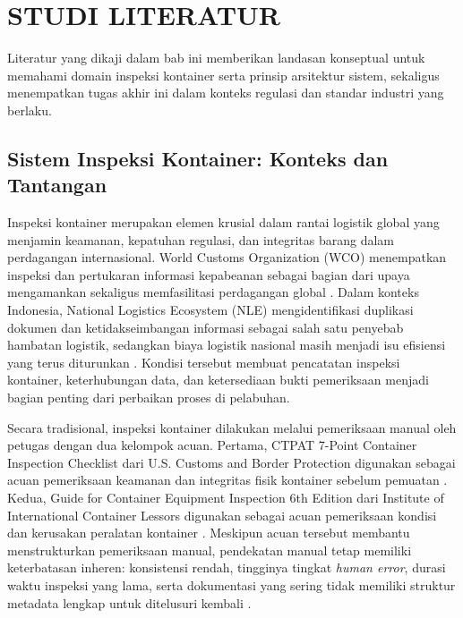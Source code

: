 \cleardoublepage
\chapter{STUDI LITERATUR}
\label{chap:studi-literatur}

Literatur yang dikaji dalam bab ini memberikan landasan konseptual untuk
memahami domain inspeksi kontainer serta prinsip arsitektur sistem, sekaligus
menempatkan tugas akhir ini dalam konteks regulasi dan standar industri yang
berlaku.

\section{Sistem Inspeksi Kontainer: Konteks dan Tantangan}

Inspeksi kontainer merupakan elemen krusial dalam rantai logistik global yang
menjamin keamanan, kepatuhan regulasi, dan integritas barang dalam perdagangan
internasional. World Customs Organization (WCO) menempatkan inspeksi dan
pertukaran informasi kepabeanan sebagai bagian dari upaya mengamankan sekaligus
memfasilitasi perdagangan global \autocite{wco2025}. Dalam konteks Indonesia,
National Logistics Ecosystem (NLE) mengidentifikasi duplikasi dokumen dan
ketidakseimbangan informasi sebagai salah satu penyebab hambatan logistik,
sedangkan biaya logistik nasional masih menjadi isu efisiensi yang terus
diturunkan \autocite{kemenkeu2023nle,pelindo2023logistik}. Kondisi tersebut
membuat pencatatan inspeksi kontainer, keterhubungan data, dan ketersediaan
bukti pemeriksaan menjadi bagian penting dari perbaikan proses di pelabuhan.

Secara tradisional, inspeksi kontainer dilakukan melalui pemeriksaan manual oleh
petugas dengan dua kelompok acuan. Pertama, CTPAT 7-Point Container Inspection
Checklist dari U.S. Customs and Border Protection digunakan sebagai acuan
pemeriksaan keamanan dan integritas fisik kontainer sebelum pemuatan
\autocite{cbp2022}. Kedua, Guide for Container Equipment Inspection 6th Edition
dari Institute of International Container Lessors digunakan sebagai acuan
pemeriksaan kondisi dan kerusakan peralatan kontainer \autocite{iicl2016}.
Meskipun acuan tersebut membantu menstrukturkan pemeriksaan manual, pendekatan
manual tetap memiliki keterbatasan inheren: konsistensi rendah, tingginya
tingkat \textit{human error}, durasi waktu inspeksi yang lama, serta dokumentasi
yang sering tidak memiliki struktur metadata lengkap untuk ditelusuri kembali
\autocite{cbp2022,iicl2016,iso27037}.

